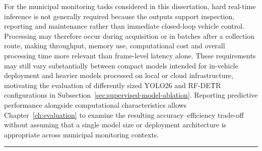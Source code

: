 \noindent For the municipal monitoring tasks considered in this dissertation, hard real-time inference is not generally required because the outputs support inspection, reporting and maintenance rather than immediate closed-loop vehicle control. Processing may therefore occur during acquisition or in batches after a collection route, making throughput, memory use, computational cost and overall processing time more relevant than frame-level latency alone. These requirements may still vary substantially between compact models intended for in-vehicle deployment and heavier models processed on local or cloud infrastructure, motivating the evaluation of differently sized \gls{YOLO}26 and \gls{RF-DETR} configurations in Subsection~\ref{sec:supervised-model-ablation}. Reporting predictive performance alongside computational characteristics allows Chapter~\ref{ch:evaluation} to examine the resulting accuracy--efficiency trade-off without assuming that a single model size or deployment architecture is appropriate across municipal monitoring contexts.

\noindent\rule{\linewidth}{0.3pt}